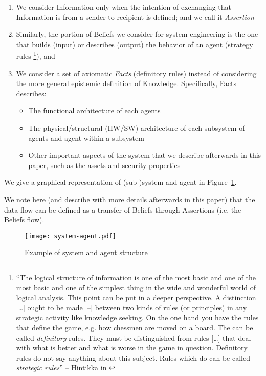\begin{enumerate}
	\item We consider Information only when the intention of exchanging 
		that Information is from a sender to 
		recipient is defined; and we call it \emph{Assertion}  
	\item Similarly, the portion of Beliefs we consider for system
		engineering is the one that builds (input) or describes
		(output) the behavior of an agent (strategy rules
		\footnote{``The logical structure of information is one of the
		most basic and one of the most basic and one of the simplest
		thing in the wide and wonderful world of logical analysis. This
		point can be put in a deeper perspective. A distinction
		[\ldots] ought to be made [--] between two kinds of rules (or
		principles) in any strategic activity like knowledge seeking.
		On the one hand you have the rules that define the game, e.g.
		how chessmen are moved on a board. The can be called
		\emph{definitory} rules.  They must be distinguished from rules
		[\ldots] that deal with what is better and what is worse in the
		game in question.  Definitory rules do not say anything about
		this subject. Rules which do can be called \emph{strategic
		rules}'' -- Hintikka in \autocite{Hintikka1993Information}}),
		and
	\item We consider a set of axiomatic \emph{Facts} (definitory rules) instead
		of considering the more general epistemic definition of
		Knowledge. Specifically, Facts describes:
		\begin{itemize}
			\item The functional architecture of each agents
			\item The physical/structural (HW/SW) architecture of each
				subsystem of agents and agent within a
				subsystem
			\item Other important aspects of the system that we
				describe afterwards in this paper, such as
				the assets and security properties 
		\end{itemize}
\end{enumerate}
We give a graphical representation of (sub-)system and agent in Figure~\ref{fig:system-agent}.

We note here (and describe with more details afterwards in this paper) that the
data flow can be defined as a transfer of Beliefs through Assertions (i.e. the
Beliefs flow).

\begin{figure}[t]
	\centering
	\texttt{[image: system-agent.pdf]}
	\caption{Example of system and agent structure}
	\label{fig:system-agent}
\end{figure}

